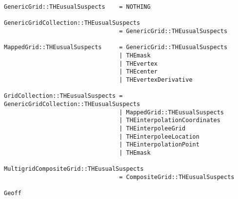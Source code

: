 {\begin{verbatim}
GenericGrid::THEusualSuspects    = NOTHING

GenericGridCollection::THEusualSuspects
                                 = GenericGrid::THEusualSuspects

MappedGrid::THEusualSuspects     = GenericGrid::THEusualSuspects
                                 | THEmask
                                 | THEvertex
                                 | THEcenter
                                 | THEvertexDerivative

GridCollection::THEusualSuspects = GenericGridCollection::THEusualSuspects
                                 | MappedGrid::THEusualSuspects
                                 | THEinterpolationCoordinates
                                 | THEinterpoleeGrid
                                 | THEinterpoleeLocation
                                 | THEinterpolationPoint
                                 | THEmask

MultigridCompositeGrid::THEusualSuspects
                                 = CompositeGrid::THEusualSuspects

Geoff

\end{verbatim}
}
